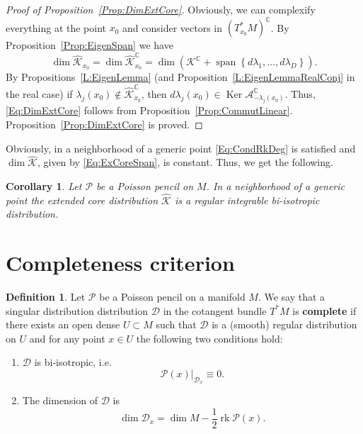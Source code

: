 \documentclass[12pt]{article}
\newtheorem{corollary}[lemma]{Corollary}
\theoremstyle{definition}
\newtheorem{definition}[lemma]{Definition}
\begin{document}
\begin{proof}[Proof of Proposition~\ref{Prop:DimExtCore}] Obviously, we can complexify everything at the point $x_0$ and consider vectors in $\left(T^*_{x_0}M\right)^{\mathbb{C}}$. By Proposition~\ref{Prop:EigenSpan} we have \[ \dim \hat{\mathcal{K}}_{x_0} = \dim \hat{\mathcal{K}}^{\mathbb{C}}_{x_0} = \dim \left( \mathcal{K}^{\mathbb{C}} \plus  \operatorname{span} \left\{ d\lambda_1, \dots, d\lambda_D \right\} \right).\] By Propositions~\ref{L:EigenLemma} (and  Proposition~\ref{L:EigenLemmaRealConj} in the real case) if  $\lambda_j(x_0) \not \in \hat{\mathcal{K}}^{\mathbb{C}}_{x_0}$, then $ d\lambda_j(x_0) \in \operatorname{Ker} \mathcal{A}^{\mathbb{C}}_{-\lambda_j(x_0)}$. Thus, \eqref{Eq:DimExtCore} follows from Proposition~\ref{Prop:CommutLinear}. Proposition~\ref{Prop:DimExtCore} is proved.  \end{proof}


Obviously, in a neighborhood of a generic point \eqref{Eq:CondRkDeg} is satisfied and  $\operatorname{dim}\hat{\mathcal{K}}$, given by \eqref{Eq:ExCoreSpan}, is constant. Thus, we get the following.  

\begin{corollary}  Let $\mathcal{P}$ be a Poisson pencil on $M$. In a neighborhood of a generic point the extended core distribution $\hat{\mathcal{K}}$ is a  regular integrable bi-isotropic distribution.
\end{corollary}


\section{Completeness criterion} \label{S:CompCrit}

\begin{definition} Let $\mathcal{P}$ be a Poisson pencil on a manifold $M$. We say that a singular distribution distribution $\mathcal{D}$ in the cotangent bundle $T^*M$ is \textbf{complete} if there exists an open dense $U \subset M$ such that $\mathcal{D}$ is a (smooth) regular distribution on $U$ and for any point $x \in U$ the following two conditions hold:

\begin{enumerate}

\item $\mathcal{D}$ is bi-isotropic, i.e. \[\mathcal{P}(x) \bigr|_{\mathcal{D}_x} \equiv 0.\] 

\item The dimension of $\mathcal{D}$ is \begin{equation} \label{Eq:DimCompleteCond} \dim \mathcal{D}_x = \dim M - \frac{1}{2}\operatorname{rk} \mathcal{P}(x).\end{equation}

\end{enumerate}


\end{definition}
\end{document}

